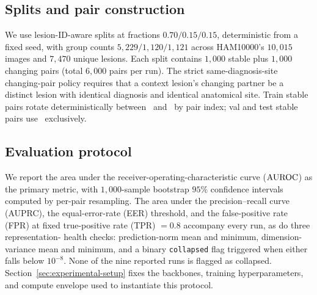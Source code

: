 \subsection{Splits and pair construction}
\label{sec:method:splits}

We use lesion-ID-aware splits at fractions $0.70 / 0.15 / 0.15$, deterministic
from a fixed seed, with group counts $5{,}229 / 1{,}120 / 1{,}121$ across
HAM10000's $10{,}015$ images and $7{,}470$ unique lesions. Each split
contains $1{,}000$ stable plus $1{,}000$ changing pairs (total $6{,}000$
pairs per run). The strict same-diagnosis-site changing-pair policy requires
that a context lesion's changing partner be a distinct lesion with identical
diagnosis and identical anatomical site. Train stable pairs rotate
deterministically between \strongfam\ and \strongholdone\ by pair index; val
and test stable pairs use \strongholdtwo\ exclusively.

\subsection{Evaluation protocol}
\label{sec:method:eval}

We report the area under the receiver-operating-characteristic curve
($\mathrm{AUROC}$) as the primary metric, with $1{,}000$-sample bootstrap
$95\%$ confidence intervals computed by per-pair resampling. The area
under the precision--recall curve (AUPRC), the equal-error-rate (EER)
threshold, and the false-positive rate (FPR) at fixed true-positive
rate (TPR) $= 0.8$ accompany every run, as do three representation-
health checks: prediction-norm mean and minimum, dimension-variance
mean and minimum, and a binary \texttt{collapsed} flag triggered when
either falls below $10^{-8}$. None of the nine reported runs is
flagged as collapsed. Section~\ref{sec:experimental-setup} fixes the
backbones, training hyperparameters, and compute envelope used to
instantiate this protocol.
